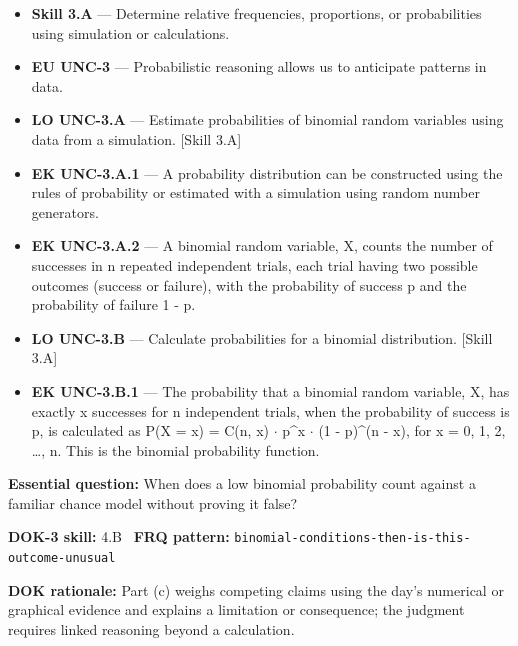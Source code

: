 \documentclass[11pt]{article}
\begin{document}


{\small
\begin{itemize}[leftmargin=1.5em,itemsep=2pt,topsep=2pt]
  \item \textbf{Skill 3.A} --- Determine relative frequencies, proportions, or probabilities using simulation or calculations.
  \item \textbf{EU UNC-3} --- Probabilistic reasoning allows us to anticipate patterns in data.
  \item \textbf{LO UNC-3.A} --- Estimate probabilities of binomial random variables using data from a simulation. [Skill 3.A]
  \item \textbf{EK UNC-3.A.1} --- A probability distribution can be constructed using the rules of probability or estimated with a simulation using random number generators.
  \item \textbf{EK UNC-3.A.2} --- A binomial random variable, X, counts the number of successes in n repeated independent trials, each trial having two possible outcomes (success or failure), with the probability of success p and the probability of failure 1 - p.
  \item \textbf{LO UNC-3.B} --- Calculate probabilities for a binomial distribution. [Skill 3.A]
  \item \textbf{EK UNC-3.B.1} --- The probability that a binomial random variable, X, has exactly x successes for n independent trials, when the probability of success is p, is calculated as P(X = x) = C(n, x) $\cdot$ p\textasciicircum{}x $\cdot$ (1 - p)\textasciicircum{}(n - x), for x = 0, 1, 2, \ldots{}, n. This is the binomial probability function.
\end{itemize}
}
\textbf{Essential question:} When does a low binomial probability count against a familiar chance model without proving it false?\par
\textbf{DOK-3 skill:} 4.B \textperiodcentered\ \textbf{FRQ pattern:} {\small\texttt{binomial-\allowbreak{}conditions-\allowbreak{}then-\allowbreak{}is-\allowbreak{}this-\allowbreak{}outcome-\allowbreak{}unusual}}\par
\textbf{DOK rationale:} Part (c) weighs competing claims using the day's numerical or graphical evidence and explains a limitation or consequence; the judgment requires linked reasoning beyond a calculation.\par
\end{document}
